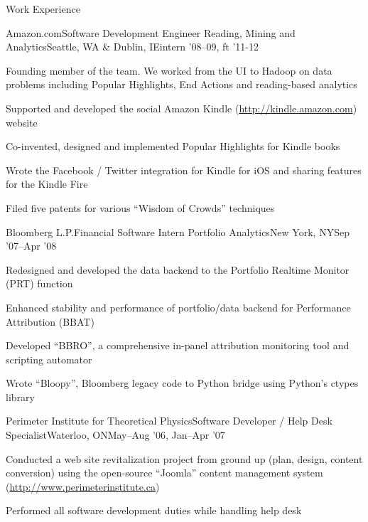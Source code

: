 \documentclass{article}
\newlength{\tabin}
\newlength{\secsep}
\newcommand{\lineunder}{\vspace*{-8pt} \\ \hspace*{-6pt} \hrulefill \\ \vspace*{-15pt}}
\newenvironment{tabbedsection}[1]{
  \begin{list}{}{
      \setlength{\itemsep}{0pt}
      \setlength{\labelsep}{0pt}
      \setlength{\labelwidth}{0pt}
      \setlength{\leftmargin}{\tabin}
      \setlength{\rightmargin}{\tabin}
      \setlength{\listparindent}{0pt}
      \setlength{\parsep}{0pt}
      \setlength{\parskip}{0pt}
      \setlength{\partopsep}{0pt}
      \setlength{\topsep}{#1}
    }
  \item[]
}{\end{list}}
\newenvironment{resume_section}[1]{
  \filbreak
  \vspace{2\secsep}
  \textsc{\large#1}
  \lineunder
  \begin{tabbedsection}{\secsep}
}{\end{tabbedsection}}
\newenvironment{subitems}{
  \renewcommand{\labelitemi}{-}
  \begin{itemize}
      \setlength{\labelsep}{1em}
}{\end{itemize}}
\newenvironment{resume_employer}[4]{
  \vspace{\secsep}
  \textbf{#1} \\ 
  \indent {\small #2} \hfill\hspace{1em}{\footnotesize#3 (#4)}
  \begin{tabbedsection}{0pt}
  \begin{subitems}
}{\end{subitems}\end{tabbedsection}}
\begin{document}
\begin{resume_section}{Work Experience}
  \begin{resume_employer}{Amazon.com}{Software Development Engineer \textperiodcentered Reading, Mining and Analytics}{Seattle, WA \& Dublin, IE}{intern '08--09, ft '11-12}
    \item Founding member of the team. We worked from the UI to Hadoop on data problems including Popular Highlights, End Actions and reading-based analytics
    \item Supported and developed the social Amazon Kindle
          ({\footnotesize \url{http://kindle.amazon.com}}) website
    \item Co-invented, designed and implemented Popular Highlights for Kindle books
    \item Wrote the Facebook / Twitter integration for Kindle for iOS and sharing features for the Kindle Fire
    \item Filed five patents for various ``Wisdom of Crowds'' techniques
  \end{resume_employer}

  \begin{resume_employer}{Bloomberg L.P.}{Financial Software Intern \textperiodcentered Portfolio Analytics}{New York, NY}{Sep '07--Apr '08}
    \item Redesigned and developed the data backend to the Portfolio Realtime Monitor (PRT) function 
    \item Enhanced stability and performance of portfolio/data backend for Performance Attribution (BBAT)
    \item Developed ``BBRO'', a comprehensive in-panel attribution monitoring tool and scripting automator
    \item Wrote ``Bloopy'', Bloomberg legacy code to Python bridge using Python's ctypes library
  \end{resume_employer}

  \begin{resume_employer}{Perimeter Institute for Theoretical Physics}{Software
  Developer / Help Desk Specialist}{Waterloo, ON}{May--Aug '06, Jan--Apr '07}
    \item Conducted a web site revitalization project from ground up (plan, design, content conversion) using the open-source ``Joomla'' content management system {\footnotesize (\url{http://www.perimeterinstitute.ca})}
    \item Performed all software development duties while handling help desk
  \end{resume_employer}
\end{resume_section}
\end{document}
